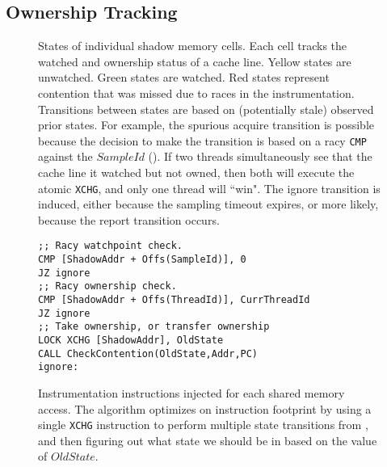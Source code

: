 \documentclass[letterpaper,twocolumn,10pt]{article}
\begin{document}
\subsection{Ownership Tracking}
\begin{figure}
\begin{center}
\end{center}
\caption{\label{fig:states_of_shadow}States of individual shadow memory cells. Each cell tracks the watched and ownership %
status of a cache line. Yellow states are unwatched. Green states are watched. Red states represent contention that was missed %
due to races in the instrumentation. Transitions between states are based on (potentially stale) observed prior states. For %
example, the spurious acquire transition is possible because the decision to make the transition is based on a racy \texttt{CMP} %
against the $SampleId$ (). If two threads simultaneously see that the cache line it watched but not %
owned, then both will execute the atomic \texttt{XCHG}, and only one thread will ``win". The ignore transition is induced, %
either because the sampling timeout expires, or more likely, because the report transition occurs.}
\end{figure}

\begin{figure}
\lstset{language=[x64]Assembler}
\begin{lstlisting}[basicstyle=\footnotesize\ttfamily]
;; Racy watchpoint check.
CMP [ShadowAddr + Offs(SampleId)], 0
JZ ignore
;; Racy ownership check.
CMP [ShadowAddr + Offs(ThreadId)], CurrThreadId
JZ ignore
;; Take ownership, or transfer ownership
LOCK XCHG [ShadowAddr], OldState
CALL CheckContention(OldState,Addr,PC)
ignore:
\end{lstlisting}
\caption{\label{fig:inline_assembly}Instrumentation instructions injected for each shared memory access. The algorithm optimizes on %
instruction footprint by using a single \texttt{XCHG} instruction to perform multiple state transitions from %
, and then figuring out what state we should be in based on the value of $OldState$.}
\end{figure}
\end{document}
